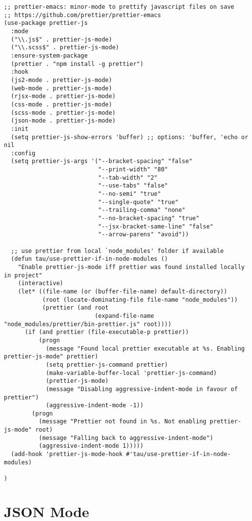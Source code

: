 \documentclass[11pt]{article}
\begin{document}
\begin{verbatim}
;; prettier-emacs: minor-mode to prettify javascript files on save
;; https://github.com/prettier/prettier-emacs
(use-package prettier-js
  :mode
  ("\\.js$" . prettier-js-mode)
  ("\\.scss$" . prettier-js-mode)
  :ensure-system-package
  (prettier . "npm install -g prettier")
  :hook
  (js2-mode . prettier-js-mode)
  (web-mode . prettier-js-mode)
  (rjsx-mode . prettier-js-mode)
  (css-mode . prettier-js-mode)
  (scss-mode . prettier-js-mode)
  (json-mode . prettier-js-mode)
  :init
  (setq prettier-js-show-errors 'buffer) ;; options: 'buffer, 'echo or nil
  :config
  (setq prettier-js-args '("--bracket-spacing" "false"
                           "--print-width" "80"
                           "--tab-width" "2"
                           "--use-tabs" "false"
                           "--no-semi" "true"
                           "--single-quote" "true"
                           "--trailing-comma" "none"
                           "--no-bracket-spacing" "true"
                           "--jsx-bracket-same-line" "false"
                           "--arrow-parens" "avoid"))

  ;; use prettier from local `node_modules' folder if available
  (defun tau/use-prettier-if-in-node-modules ()
    "Enable prettier-js-mode iff prettier was found installed locally in project"
    (interactive)
    (let* ((file-name (or (buffer-file-name) default-directory))
           (root (locate-dominating-file file-name "node_modules"))
           (prettier (and root
                          (expand-file-name "node_modules/prettier/bin-prettier.js" root))))
      (if (and prettier (file-executable-p prettier))
          (progn
            (message "Found local prettier executable at %s. Enabling prettier-js-mode" prettier)
            (setq prettier-js-command prettier)
            (make-variable-buffer-local 'prettier-js-command)
            (prettier-js-mode)
            (message "Disabling aggressive-indent-mode in favour of prettier")
            (aggressive-indent-mode -1))
        (progn
          (message "Prettier not found in %s. Not enabling prettier-js-mode" root)
          (message "Falling back to aggressive-indent-mode")
          (aggressive-indent-mode 1)))))
  (add-hook 'prettier-js-mode-hook #'tau/use-prettier-if-in-node-modules)

)
\end{verbatim}


\section*{JSON Mode}
\label{sec:org21805da}
\end{document}
